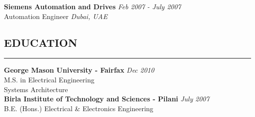 \documentclass{article}
\begin{document}
    {\bf Siemens Automation and Drives} \hfill {\em Feb 2007 - July 2007} \\
    Automation Engineer \hfill {\em Dubai, UAE} \\
    \smallskip

%
\subsection*{\MakeUppercase{\bf Education}}
    \hrule
    \bigskip
    {\bf George Mason University - Fairfax} \hfill {\em Dec 2010} \\ 
    M.S. in Electrical Engineering \\
    Systems Architecture \bigskip \\

    {\bf Birla Institute of Technology and Sciences - Pilani}
    \hfill {\em July 2007} \\ 
    B.E. (Hons.) Electrical \& Electronics Engineering \bigskip \\
\end{document}
